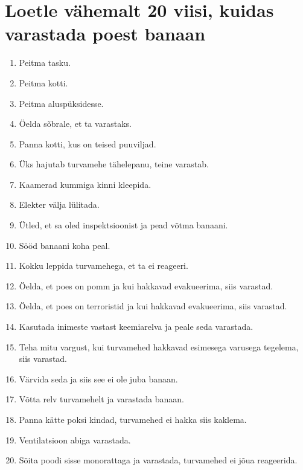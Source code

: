 \documentclass{article}
\begin{document}
\section{Loetle vähemalt 20 viisi, kuidas varastada poest banaan}
\begin{enumerate}
	\item{Peitma tasku.}
	\item{Peitma kotti.}
	\item{Peitma aluspüksidesse.}
	\item{Öelda sõbrale, et ta varastaks.}
	\item{Panna kotti, kus on teised puuviljad.}
	\item{Üks hajutab turvamehe tähelepanu, teine varastab.}
	\item{Kaamerad kummiga kinni kleepida.}
	\item{Elekter välja lülitada.}
	\item{Ütled, et sa oled inspektsioonist ja pead võtma banaani.}
	\item{Sööd banaani koha peal.}
	\item{Kokku leppida turvamehega, et ta ei reageeri.}
	\item{Öelda, et poes on pomm ja kui hakkavad evakueerima, siis varastad.}
	\item{Öelda, et poes on terroristid ja kui hakkavad evakueerima, siis varastad.}
	\item{Kasutada inimeste vastast keemiarelva ja peale seda varastada.}
	\item{Teha mitu vargust, kui turvamehed hakkavad esimesega varusega tegelema, siis varastad.}
	\item{Värvida seda ja siis see ei ole juba banaan.}
	\item{Võtta relv turvamehelt ja varastada banaan.}
	\item{Panna kätte poksi kindad, turvamehed ei hakka siis kaklema.}
	\item{Ventilatsioon abiga varastada.}
	\item{Sõita poodi sisse monorattaga ja varastada, turvamehed ei jõua reageerida.}
\end{enumerate}
\end{document}
